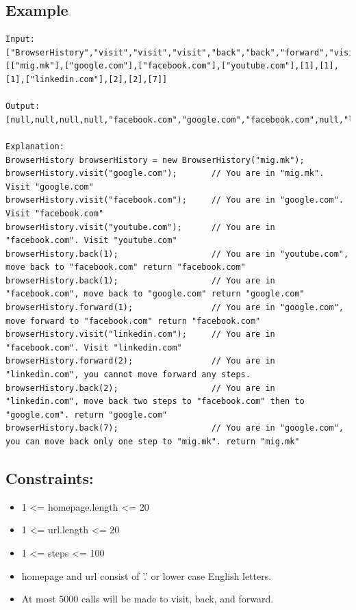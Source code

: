 \documentclass[11pt]{article}
\begin{document}
\subsection{Example}
\label{sec:org9c7c2bc}
\begin{verbatim}
Input:
["BrowserHistory","visit","visit","visit","back","back","forward","visit","forward","back","back"]
[["mig.mk"],["google.com"],["facebook.com"],["youtube.com"],[1],[1],[1],["linkedin.com"],[2],[2],[7]]

Output:
[null,null,null,null,"facebook.com","google.com","facebook.com",null,"linkedin.com","google.com","mig.mk"]

Explanation:
BrowserHistory browserHistory = new BrowserHistory("mig.mk");
browserHistory.visit("google.com");       // You are in "mig.mk". Visit "google.com"
browserHistory.visit("facebook.com");     // You are in "google.com". Visit "facebook.com"
browserHistory.visit("youtube.com");      // You are in "facebook.com". Visit "youtube.com"
browserHistory.back(1);                   // You are in "youtube.com", move back to "facebook.com" return "facebook.com"
browserHistory.back(1);                   // You are in "facebook.com", move back to "google.com" return "google.com"
browserHistory.forward(1);                // You are in "google.com", move forward to "facebook.com" return "facebook.com"
browserHistory.visit("linkedin.com");     // You are in "facebook.com". Visit "linkedin.com"
browserHistory.forward(2);                // You are in "linkedin.com", you cannot move forward any steps.
browserHistory.back(2);                   // You are in "linkedin.com", move back two steps to "facebook.com" then to "google.com". return "google.com"
browserHistory.back(7);                   // You are in "google.com", you can move back only one step to "mig.mk". return "mig.mk"
\end{verbatim}


\subsection{Constraints:}
\label{sec:orgb155068}
\begin{itemize}
\item 1 <= homepage.length <= 20
\item 1 <= url.length <= 20
\item 1 <= steps <= 100
\item homepage and url consist of  '.' or lower case English letters.
\item At most 5000 calls will be made to visit, back, and forward.
\end{itemize}
\end{document}
